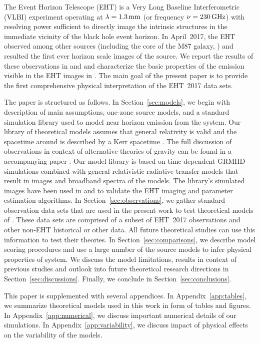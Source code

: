 The Event Horizon Telescope (EHT) is a Very Long Baseline Interferometric (VLBI) experiment operating at $\lambda = 1.3\,\mathrm{mm}$ (or frequency $\nu = 230\,\mathrm{GHz}$) with resolving power sufficient to directly image the intrinsic \sgra structures in the immediate vicinity of the black hole event horizon.
In April~2017, the EHT observed \sgra among other sources (including the core of the M87 galaxy, ) and resulted the first ever horizon scale images of the source.
We report the results of these observations in  and  and characterize the basic properties of the emission visible in the EHT images in .
The main goal of the present paper  is to provide the first comprehensive physical interpretation of the EHT~2017 \sgra data sets.

The paper is structured as follows.
In Section~\ref{sec:models}, we begin with description of main assumptions, one-zone source models, and a standard simulation library used to model near horizon emission from the \sgra system.
Our library of theoretical models assumes that general relativity is valid and the spacetime around \sgra is described by a Kerr spacetime \citep{1963PhRvL..11..237K}.
The full discussion of \sgra observations in context of alternative theories of gravity can be found in a accompanying paper .
Our model library is based on time-dependent GRMHD simulations combined with general relativistic radiative transfer models that result in images and broadband spectra of the models.
The library's simulated images have been used in  and  to validate the \sgra EHT imaging and parameter estimation algorithms.
In Section~\ref{sec:observations}, we gather standard observation data sets that are used in the present work to test theoretical models of \sgra.
These data sets are comprised of a subset of EHT~2017 observations and other non-EHT historical or other data.
All future theoretical studies can use this information to test their theories.
In Section~\ref{sec:comparisons}, we describe model scoring procedures and use a large number of the source models to infer physical properties of \sgra system.
We discuss the model limitations, results in context of previous studies and outlook into future \sgra theoretical research directions in Section~\ref{sec:discussions}.
Finally, we conclude in Section~\ref{sec:conclusions}.

This paper is supplemented with several appendices.
In Appendix~\ref{app:tables},      we summarize theoretical models used in this work in form of tables and figures.
In Appendix~\ref{app:numerical},   we discuss important numerical details of our simulations.
In Appendix~\ref{app:variability}, we discuss impact of physical effects on the variability of the models.
